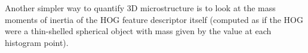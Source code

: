 \documentclass[review]{elsarticle}
\begin{document}
	
	Another simpler way to quantify 3D microstructure is to look at the mass moments of inertia of the HOG feature descriptor itself (computed as if the HOG were a thin-shelled spherical object with mass given by the value at each histogram point).
	
\end{document}
